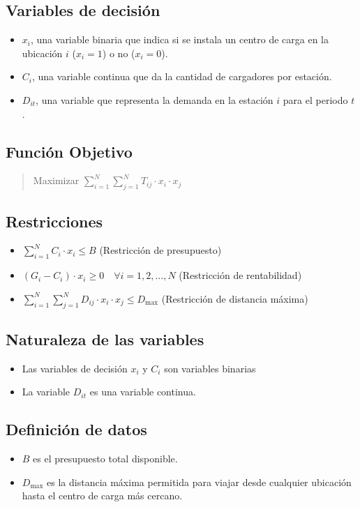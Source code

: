 \documentclass[letterpaper]{article}
\begin{document}
\begin{flushleft}
		\subsection{Variables de decisión} 
		\begin{itemize}
			\item $x_i$, una variable binaria que indica si se instala un centro de carga en la ubicación $i$ ($x_i = 1$) o no ($x_i = 0$).
			\item $C_i$, una variable continua que da la cantidad de cargadores por estación.
			\item $D_{it}$, una variable que representa la demanda en la estación $i$ para el periodo $t$.
		\end{itemize}
		\subsection{Función Objetivo}
		\begin{quote}
			\begin{center}
				Maximizar $\sum_{i=1}^{N}\sum_{j=1}^{N} T_{ij} \cdot x_i \cdot x_j$
			\end{center}
		\end{quote}
		\subsection{Restricciones}
		\begin{itemize}
			\item $\sum_{i=1}^{N} C_i \cdot x_i \leq B$ (Restricción de presupuesto)
			\item $(G_i - C_i) \cdot x_i \geq 0 \quad \forall i=1,2,\ldots,N$ (Restricción de rentabilidad)
			\item $\sum_{i=1}^{N} \sum_{j=1}^{N} D_{ij} \cdot x_i \cdot x_j \leq D_{\text{max}}$ (Restricción de distancia máxima)
		\end{itemize}
		\subsection{Naturaleza de las variables}
		\begin{itemize}
			\item Las variables de decisión $x_i$ y $C_i$ son variables binarias
			\item La variable $D_{it}$ es una variable continua.
		\end{itemize}
		\subsection{Definición de datos}
		\begin{itemize}
			\item $B$ es el presupuesto total disponible.
			\item $D_{\text{max}}$ es la distancia máxima permitida para viajar desde cualquier ubicación hasta el centro de carga más cercano.
		\end{itemize}
		
	\end{flushleft}
	
\end{document}
